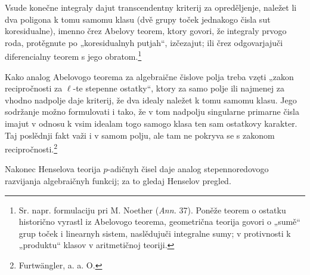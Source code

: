 \documentclass[11pt]{article}
\begin{document}
Vsude konečne integraly dajut transcendentny kriterij za opreděljenje, naležet li dva poligona k tomu samomu klasu (dvě grupy toček jednakogo čisla sut koresidualne), imenno črez Abelovy teorem, ktory govori, že integraly prvogo roda, protěgnute po „koresidualnyh putjah“, izčezajut; ili črez odgovarjajuči diferencialny teorem s jego obratom.\footnote{Sr. napr. formulaciju pri M. Noether (\emph{Ann.} 37). Poněže teorem o ostatku historično vyrastl iz Abelovogo teorema, geometrična teorija govori o „sumě“ grup toček i linearnyh sistem, naslědujuči integralne sumy; v protivnosti k „produktu“ klasov v aritmetičnoj teoriji.}

Kako analog Abelovogo teorema za algebraične čislove polja treba vzęti „zakon recipročnosti za \(\ell\)-te stepenne ostatky“, ktory za samo polje ili najmenej za vhodno nadpolje daje kriterij, že dva idealy naležet k tomu samomu klasu. Jego sodržanje možno formulovati i tako, že v tom nadpolju singularne primarne čisla imajut v odnosu k vsim idealam togo samogo klasa ten sam ostatkovy karakter. Taj poslědnji fakt važi i v samom polju, ale tam ne pokryva se s zakonom recipročnosti.\footnote{Furtwängler, a. a. O.}

Nakonec Henselova teorija \(p\)-adičnyh čisel daje analog stepennoredovogo razvijanja algebraičnyh funkcij; za to gledaj Henselov pregled.
\end{document}
